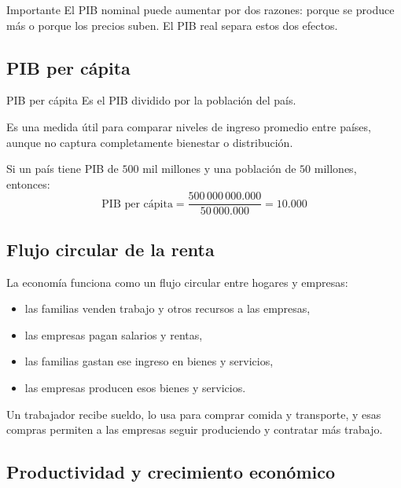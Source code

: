 \begin{observacion}{Importante}
El PIB nominal puede aumentar por dos razones: porque se produce más o porque los precios suben. El PIB real separa estos dos efectos.
\end{observacion}

\subsection{PIB per cápita}

\begin{concepto}{PIB per cápita}
Es el PIB dividido por la población del país.
\end{concepto}

Es una medida útil para comparar niveles de ingreso promedio entre países, aunque no captura completamente bienestar o distribución.

\begin{ejemplo}
Si un país tiene PIB de $500$ mil millones y una población de $50$ millones, entonces:
\[\text{PIB per cápita} = \frac{500\,000\,000.000}{50\,000.000} = 10.000
\]
\end{ejemplo}

\subsection{Flujo circular de la renta}

La economía funciona como un flujo circular entre hogares y empresas:
\begin{itemize}
    \item las familias venden trabajo y otros recursos a las empresas,
    \item las empresas pagan salarios y rentas,
    \item las familias gastan ese ingreso en bienes y servicios,
    \item las empresas producen esos bienes y servicios.
\end{itemize}

\begin{ejemplo}
Un trabajador recibe sueldo, lo usa para comprar comida y transporte, y esas compras permiten a las empresas seguir produciendo y contratar más trabajo.
\end{ejemplo}

\subsection{Productividad y crecimiento económico}

